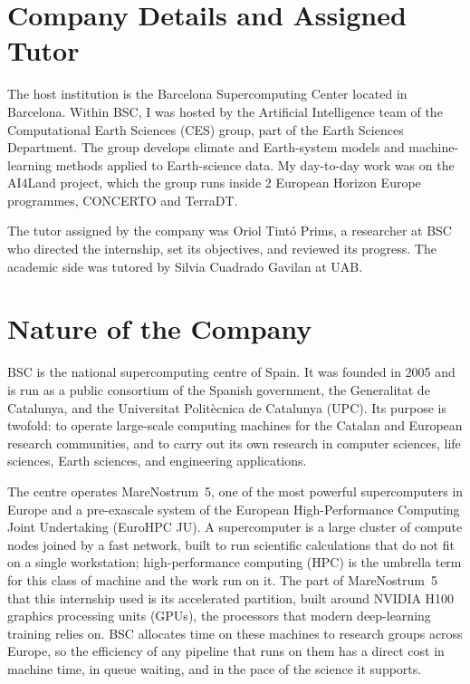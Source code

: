 \documentclass[12pt,a4paper]{article}
\begin{document}
\section{Company Details and Assigned Tutor}

The host institution is the Barcelona Supercomputing Center located in Barcelona. Within BSC, I was
hosted by the Artificial Intelligence team of the Computational Earth Sciences (CES) group, part of
the Earth Sciences Department. The group develops climate and Earth-system models and
machine-learning methods applied to Earth-science data. My day-to-day work was on the AI4Land
project, which the group runs inside 2 European Horizon Europe programmes, CONCERTO and TerraDT.

The tutor assigned by the company was Oriol Tint\'o Prims, a researcher at BSC who directed the
internship, set its objectives, and reviewed its progress. The academic side was tutored by
Silvia Cuadrado Gavilan at UAB.

\section{Nature of the Company}

BSC is the national supercomputing centre of Spain. It was founded in 2005 and is run as a
public consortium of the Spanish government, the Generalitat de Catalunya, and the Universitat
Polit\`ecnica de Catalunya (UPC). Its purpose is twofold: to operate large-scale computing
machines for the Catalan and European research communities, and to carry out its own research
in computer sciences, life sciences, Earth sciences, and engineering applications.

The centre operates MareNostrum~5, one of the most powerful supercomputers in Europe and a
pre-exascale system of the European High-Performance Computing Joint Undertaking (EuroHPC JU).
A supercomputer is a large cluster of compute nodes joined by a fast network, built to run
scientific calculations that do not fit on a single workstation; high-performance computing
(HPC) is the umbrella term for this class of machine and the work run on it. The part of
MareNostrum~5 that this internship used is its accelerated partition, built around NVIDIA H100
graphics processing units (GPUs), the processors that modern deep-learning training relies on.
BSC allocates time on these machines to research groups across Europe, so the efficiency of any
pipeline that runs on them has a direct cost in machine time, in queue waiting, and in the pace
of the science it supports.
\end{document}
